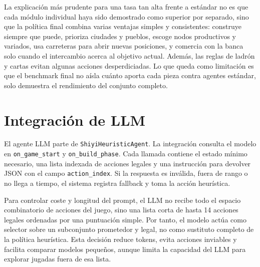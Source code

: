 ﻿\documentclass[10pt,a4paper]{article}
\begin{document}
La explicación más prudente para una tasa tan alta frente a estándar no es que cada módulo individual haya sido demostrado como superior por separado, sino que la política final combina varias ventajas simples y consistentes: construye siempre que puede, prioriza ciudades y pueblos, escoge nodos productivos y variados, usa carreteras para abrir nuevas posiciones, y comercia con la banca solo cuando el intercambio acerca al objetivo actual. Además, las reglas de ladrón y cartas evitan algunas acciones desperdiciadas. Lo que queda como limitación es que el benchmark final no aísla cuánto aporta cada pieza contra agentes estándar, solo demuestra el rendimiento del conjunto completo.

\section{Integración de LLM}
El agente LLM parte de \texttt{ShiyiHeuristicAgent}. La integración consulta el modelo en \texttt{on\_game\_start} y \texttt{on\_build\_phase}. Cada llamada contiene el estado mínimo necesario, una lista indexada de acciones legales y una instrucción para devolver JSON con el campo \texttt{action\_index}. Si la respuesta es inválida, fuera de rango o no llega a tiempo, el sistema registra fallback y toma la acción heurística.

Para controlar coste y longitud del prompt, el LLM no recibe todo el espacio combinatorio de acciones del juego, sino una lista corta de hasta 14 acciones legales ordenadas por una puntuación simple. Por tanto, el modelo actúa como selector sobre un subconjunto prometedor y legal, no como sustituto completo de la política heurística. Esta decisión reduce tokens, evita acciones inviables y facilita comparar modelos pequeños, aunque limita la capacidad del LLM para explorar jugadas fuera de esa lista.
\end{document}
